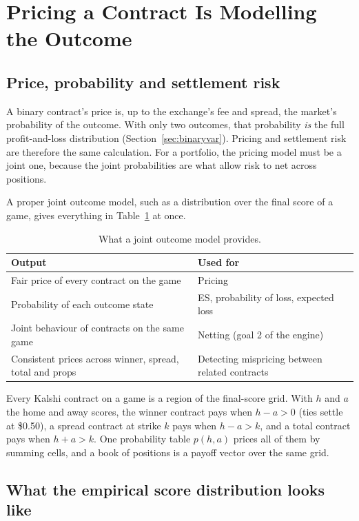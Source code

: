 \section{Pricing a Contract Is Modelling the Outcome}\label{sec:pricing}

\subsection{Price, probability and settlement risk}

A binary contract's price is, up to the exchange's fee and spread, the market's probability of the outcome. With only two outcomes, that probability \emph{is} the full profit-and-loss distribution (Section~\ref{sec:binaryvar}). Pricing and settlement risk are therefore the same calculation. For a portfolio, the pricing model must be a joint one, because the joint probabilities are what allow risk to net across positions.

A proper joint outcome model, such as a distribution over the final score of a game, gives everything in Table~\ref{tab:joint_uses} at once.

\begin{table}[H]
\centering
\small
\begin{tabular}{p{6.5cm}p{6.5cm}}
\toprule
\textbf{Output} & \textbf{Used for} \\
\midrule
Fair price of every contract on the game & Pricing \\
Probability of each outcome state & ES, probability of loss, expected loss \\
Joint behaviour of contracts on the same game & Netting (goal 2 of the engine) \\
Consistent prices across winner, spread, total and props & Detecting mispricing between related contracts \\
\bottomrule
\end{tabular}
\caption{What a joint outcome model provides.}
\label{tab:joint_uses}
\end{table}

Every Kalshi contract on a game is a region of the final-score grid. With $h$ and $a$ the home and away scores, the winner contract pays when $h-a>0$ (ties settle at \$0.50), a spread contract at strike $k$ pays when $h-a>k$, and a total contract pays when $h+a>k$. One probability table $p(h,a)$ prices all of them by summing cells, and a book of positions is a payoff vector over the same grid.

\subsection{What the empirical score distribution looks like}

